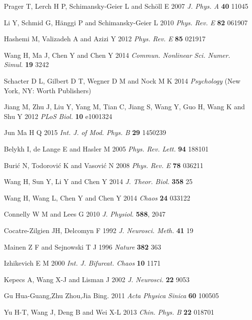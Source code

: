\documentclass[twocolumn,showpacs,preprintnumbers,amsmath,amssymb,pre,superscriptaddress]{revtex4-1}
\begin{document}
\begin{CJK}{UTF8}{gbsn}
\begin{thebibliography}{999}
 Prager T, Lerch H P, Schimansky-Geier L and Sch\"{o}ll E 2007 \textit{J. Phys. A} \textbf{40} 11045


  Li Y, Schmid G, Hänggi P and Schimansky-Geier L 2010 \textit{Phys. Rev. E} \textbf{82} 061907

  Hashemi M, Valizadeh A and Azizi Y 2012 \textit{Phys. Rev. E} \textbf{85} 021917


 Wang H, Ma J, Chen Y and Chen Y 2014 \textit{Commun. Nonlinear Sci. Numer. Simul.} \textbf{19} 3242

 Schacter D L, Gilbert D T, Wegner D M and Nock M K 2014 \textit{Psychology} (New York, NY: Worth Publishers)

  Jiang M, Zhu J, Liu Y, Yang M, Tian C, Jiang S, Wang Y, Guo H, Wang K and Shu Y 2012 \textit{PLoS Biol.} \textbf{10} e1001324

 Jun Ma H Q 2015 \textit{Int. J. of Mod. Phys. B} \textbf{29} 1450239

 Belykh I, de Lange E and Hasler M 2005 \textit{Phys. Rev. Lett.} \textbf{94} 188101

 Buri\'{c} N, Todorovi\'{c} K and Vasovi\'{c} N 2008 \textit{Phys. Rev. E} \textbf{78} 036211 

 Wang H, Sun Y, Li Y and Chen Y 2014 \textit{J. Theor. Biol.} \textbf{358} 25

 Wang H, Wang L, Chen Y and Chen Y 2014 \textit{Chaos} \textbf{24} 033122

Connelly W M and Lees G 2010 \textit{J. Physiol.} \textbf{588}, 2047

Cocatre-Zilgien JH, Delcomyn F 1992 \textit{J. Neurosci. Meth.} \textbf{41} 19 

  Mainen Z F and Sejnowski T J 1996 \textit{Nature} \textbf{382} 363

  Izhikevich E M 2000 \textit{Int. J. Bifurcat. Chaos} \textbf{10} 1171

   Kepecs A, Wang X-J and Lisman J 2002 \textit{J. Neurosci.} \textbf{22} 9053

 Gu Hua-Guang,Zhu Zhou,Jia Bing. 2011 \textit{Acta Physica Sinica} \textbf{60} 100505

 Yu H-T, Wang J, Deng B and Wei X-L 2013 \textit{Chin. Phys. B} \textbf{22} 018701


\end{thebibliography}
\end{CJK}
\end{document}
